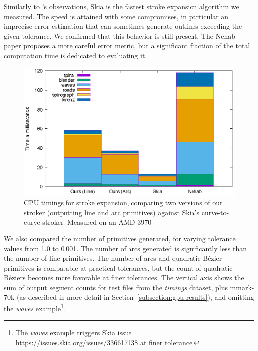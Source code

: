 \documentclass[sigconf, nonacm]{acmart}
\begin{document}
Similarly to \citet{Nehab2020}'s observations, Skia is the fastest stroke expansion algorithm we measured. The speed is attained with some compromises, in particular an imprecise error estimation that can sometimes generate outlines exceeding the given tolerance. We confirmed that this behavior is still present. The Nehab paper proposes a more careful error metric, but a significant fraction of the total computation time is dedicated to evaluating it.

\begin{figure}
    \includegraphics[scale=0.6]{timings}
    \caption{CPU timings for stroke expansion, comparing two versions of our stroker (outputting line and arc primitives) against Skia's curve-to-curve stroker. Measured on an AMD 3970}
    \label{fig:timings}
\end{figure}

We also compared the number of primitives generated, for varying tolerance values from 1.0 to 0.001. The number of arcs generated is significantly less than the number of line primitives. The number of arcs and quadratic Bézier primitives is comparable at practical tolerances, but the count of quadratic Béziers becomes more favorable at finer tolerances. The vertical axis shows the sum of output segment counts for test files from the \emph{timings} dataset, plus mmark-70k (as described in more detail in Section~\ref{subsection:gpu-results}), and omitting the \emph{waves} example\footnote{The \emph{waves} example triggers Skia issue https://issues.skia.org/issues/336617138 at finer tolerance.}.
\end{document}
